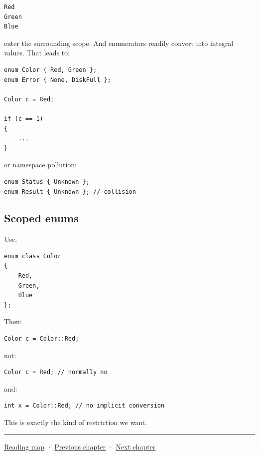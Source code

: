 \begin{verbatim}
Red
Green
Blue
\end{verbatim}

enter the surrounding scope. And enumerators readily convert into integral values. That leads to:

\begin{verbatim}
enum Color { Red, Green };
enum Error { None, DiskFull };

Color c = Red;

if (c == 1)
{
    ...
}
\end{verbatim}

or namespace pollution:

\begin{verbatim}
enum Status { Unknown };
enum Result { Unknown }; // collision
\end{verbatim}

\subsection{Scoped enums}\label{05-engine-i-ch002-scoped-enums}

Use:

\begin{verbatim}
enum class Color
{
    Red,
    Green,
    Blue
};
\end{verbatim}

Then:

\begin{verbatim}
Color c = Color::Red;
\end{verbatim}

not:

\begin{verbatim}
Color c = Red; // normally no
\end{verbatim}

and:

\begin{verbatim}
int x = Color::Red; // no implicit conversion
\end{verbatim}

This is exactly the kind of restriction we want.

\begin{center}\rule{0.5\linewidth}{0.5pt}\end{center}

\hyperref[volume-reading-map]{Reading map} · \hyperref[05-engine-i-ch001-a-game-promise-becomes-bytes-and-running-state]{Previous chapter} · \hyperref[05-engine-i-ch003-object-representation-lifetime-and-enforceable-promises]{Next chapter}

